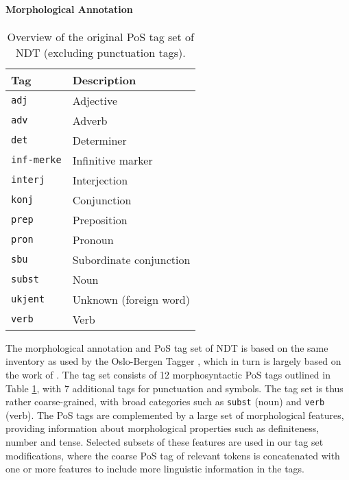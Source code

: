 \documentclass[11pt,a4paper]{article}
\begin{document}
\paragraph{Morphological Annotation}
\begin{table}
    \centering
    \smaller[0.5]
    \begin{tabular}{@{}ll@{}}
        \toprule
        \textbf{Tag} & \textbf{Description} \\
        \midrule
        \texttt{adj} & Adjective \\
        \texttt{adv} & Adverb \\
        \texttt{det} & Determiner\\
        \texttt{inf-merke} & Infinitive marker \\
        \texttt{interj} & Interjection \\
        \texttt{konj} & Conjunction \\
        \texttt{prep} & Preposition \\
        \texttt{pron} & Pronoun \\
        \texttt{sbu} & Subordinate conjunction \\
        \texttt{subst} & Noun \\
        \texttt{ukjent} & Unknown (foreign word) \\
        \texttt{verb} & Verb \\
        \bottomrule
    \end{tabular}
    \caption{Overview of the original PoS tag set of NDT (excluding punctuation
        tags).}
    \label{ndttagset}
\end{table}

The morphological annotation and PoS tag set of NDT is based on the same
inventory as used by the Oslo-Bergen Tagger \cite{Hag:Joh:Nok:00,Sol:13}, which
in turn is largely based on the work of . The tag set
consists of 12 morphosyntactic PoS tags outlined in Table \ref{ndttagset}, with
7 additional tags for punctuation and symbols. The tag set is thus rather
coarse-grained, with broad categories such as \texttt{subst} (noun) and
\texttt{verb} (verb). The PoS tags are complemented by a large set of
morphological features, providing information about morphological properties
such as definiteness, number and tense.  Selected subsets of these features are
used in our tag set modifications, where the coarse PoS tag of relevant tokens
is concatenated with one or more features to include more linguistic
information in the tags.
\end{document}
